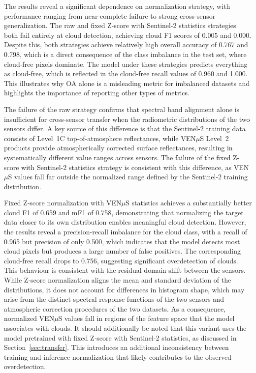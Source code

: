The results reveal a significant dependence on normalization strategy, with performance ranging from near-complete failure to strong cross-sensor generalization. The raw and fixed Z-score with Sentinel-2 statistics strategies both fail entirely at cloud detection, achieving cloud F1 scores of 0.005 and 0.000. Despite this, both strategies achieve relatively high overall accuracy of 0.767 and 0.798, which is a direct consequence of the class imbalance in the test set, where cloud-free pixels dominate. The model under these strategies predicts everything as cloud-free, which is reflected in the cloud-free recall values of 0.960 and 1.000. This illustrates why OA alone is a misleading metric for imbalanced datasets and highlights the importance of reporting other types of metrics.

The failure of the raw strategy confirms that spectral band alignment alone is insufficient for cross-sensor transfer when the radiometric distributions of the two sensors differ. A key source of this difference is that the Sentinel-2 training data consists of Level~1C top-of-atmosphere reflectances, while VEN$\mu$S Level~2 products provide atmospherically corrected surface reflectances, resulting in systematically different value ranges across sensors. The failure of the fixed Z-score with Sentinel-2 statistics strategy is consistent with this difference, as VEN$\mu$S values fall far outside the normalized range defined by the Sentinel-2 training distribution.

Fixed Z-score normalization with VEN$\mu$S statistics achieves a substantially better cloud F1 of 0.659 and mF1 of 0.758, demonstrating that normalizing the target data closer to its own distribution enables meaningful cloud detection. However, the results reveal a precision-recall imbalance for the cloud class, with a recall of 0.965 but precision of only 0.500, which indicates that the model detects most cloud pixels but produces a large number of false positives. The corresponding cloud-free recall drops to 0.756, suggesting significant overdetection of clouds. This behaviour is consistent with the residual domain shift between the sensors. While Z-score normalization aligns the mean and standard deviation of the distributions, it does not account for differences in histogram shape, which may arise from the distinct spectral response functions of the two sensors and atmospheric correction procedures of the two datasets. As a consequence, normalized VEN$\mu$S values fall in regions of the feature space that the model associates with clouds. It should additionally be noted that this variant uses the model pretrained with fixed Z-score with Sentinel-2 statistics, as discussed in Section~\ref{sec:transfer}. This introduces an additional inconsistency between training and inference normalization that likely contributes to the observed overdetection.

